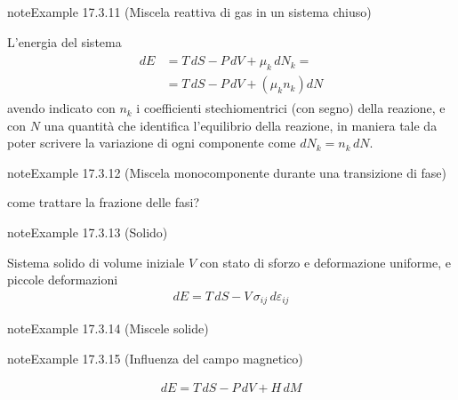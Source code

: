 \documentclass[letterpaper,10pt,italian]{jupyterBook}
\begin{document}
\begin{sphinxadmonition}{note}{Example 17.3.11 (Miscela reattiva di gas in un sistema chiuso)}



\sphinxAtStartPar
L’energia del sistema
\begin{equation*}
\begin{split}\begin{aligned}
  dE & = T \, dS - P \, dV + \mu_k \, dN_k = \\
     & = T \, dS - P \, dV + \left( \mu_k n_k \right) dN
\end{aligned}\end{split}
\end{equation*}
\sphinxAtStartPar
avendo indicato con \(n_k\) i coefficienti stechiomentrici (con segno) della reazione, e con \(N\) una quantità che identifica l’equilibrio della reazione, in maniera tale da poter scrivere la variazione di ogni componente come \(d N_k = n_k \, d N\).
\end{sphinxadmonition}
\label{ch/thermodynamics/principles-gibbs-phase-rule:example-15}
\begin{sphinxadmonition}{note}{Example 17.3.12 (Miscela monocomponente durante una transizione di fase)}



\sphinxAtStartPar
{} come trattare la frazione delle fasi?
\end{sphinxadmonition}
\label{ch/thermodynamics/principles-gibbs-phase-rule:example-16}
\begin{sphinxadmonition}{note}{Example 17.3.13 (Solido)}



\sphinxAtStartPar
Sistema solido di volume iniziale \(V\) con stato di sforzo e deformazione uniforme, e piccole deformazioni
\begin{equation*}
\begin{split}dE = T \, dS - V \, \sigma_{ij} \, d \varepsilon_{ij} \end{split}
\end{equation*}\end{sphinxadmonition}
\label{ch/thermodynamics/principles-gibbs-phase-rule:example-17}
\begin{sphinxadmonition}{note}{Example 17.3.14 (Miscele solide)}



\sphinxAtStartPar
{}
\end{sphinxadmonition}
\label{ch/thermodynamics/principles-gibbs-phase-rule:example-18}
\begin{sphinxadmonition}{note}{Example 17.3.15 (Influenza del campo magnetico)}


\begin{equation*}
\begin{split}dE = T \, dS - P \, d V + H \, dM\end{split}
\end{equation*}
\sphinxAtStartPar
{}
\end{sphinxadmonition}
\end{document}
